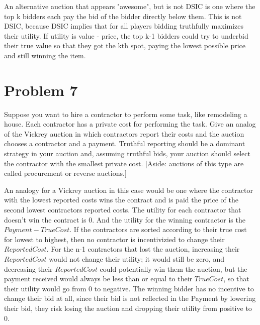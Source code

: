 \documentclass{article}
\begin{document}
An alternative auction that appears "awesome", but is not DSIC is one where
the top k bidders each pay the bid of the bidder directly below them.  This is not DSIC, because DSIC implies that for all players bidding truthfully
maximizes their utility.  If utility is value - price, the top k-1 bidders
could try to underbid their true value so that they got the kth spot, paying
the lowest possible price and still winning the item.

\section*{Problem 7}
Suppose you want to hire a contractor to perform some task, like remodeling a house. Each contractor has a private cost for performing the task. Give an analog of the Vickrey auction in which contractors report their costs and the auction chooses a contractor and a payment. Truthful reporting should be a dominant strategy in your auction and, assuming truthful bids, your auction should select the contractor with the smallest private cost.
[Aside: auctions of this type are called procurement or reverse auctions.]

An analogy for a Vickrey auction in this case would be one where the
contractor with the lowest reported costs wins the contract and is paid the
price of the second lowest contractors reported costs.  The utility for each
contractor that doesn't win the contract is 0.  And the utility for the
winning contractor is the $Payment - TrueCost$.  If the contractors are sorted
according to their true cost for lowest to highest, then no contractor is
incentivizied to change their $ReportedCost$.  For the n-1 contractors that
lost the auction, increasing their $ReportedCost$ would not change their
utility; it would still be zero, and decreasing their $ReportedCost$ could
potentially win them the auction, but the payment received would always be
less than or equal to their $TrueCost$, so that their utility would go from 0
to negative.  The winning bidder has no incentive to change their bid at all,
since their bid is not reflected in the Payment by lowering their bid, they
risk losing the auction and dropping their utility from positive to 0.
\end{document}
